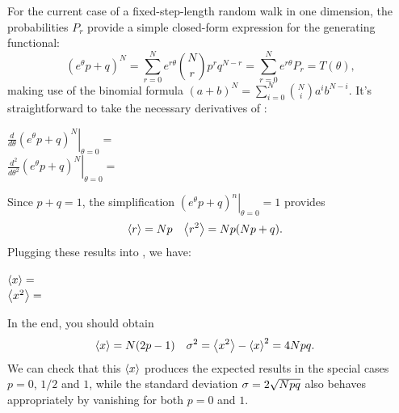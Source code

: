 For the current case of a fixed-step-length random walk in one dimension, the probabilities $P_r$ provide a simple closed-form expression for the generating functional:
\begin{equation}
  \label{eq:gen_func}
  \left(e^{\theta} p + q\right)^N = \sum_{r = 0}^N e^{r \theta} \binom{N}{r} p^r q^{N - r} = \sum_{r = 0}^N e^{r \theta} P_r = T(\theta),
\end{equation}
making use of the binomial formula $\left(a + b\right)^N = \sum_{i = 0}^N \binom{N}{i} a^i b^{N - i}$.
It's straightforward to take the necessary derivatives of :
\begin{mdframed}
  $\displaystyle \left.\frac{d}{d\theta} \left(e^{\theta} p + q\right)^N \right|_{\theta = 0} = $ \\[50 pt]
  $\displaystyle \left.\frac{d^2}{d\theta^2} \left(e^{\theta} p + q\right)^N \right|_{\theta = 0} = $ \\[50 pt]
\end{mdframed}
Since $p + q = 1$, the simplification $\left.\left(e^{\theta} p + q\right)^n \right|_{\theta = 0} = 1$ provides
\begin{align*}
  \left\langle r \right\rangle   & = Np &
  \left\langle r^2 \right\rangle & = Np(Np + q).
\end{align*}
\newpage %
\noindent Plugging these results into , we have:
\begin{mdframed}
  $\left\langle x \right\rangle   = $ \\[50 pt]
  $\left\langle x^2 \right\rangle = $ \\[50 pt]
\end{mdframed}
In the end, you should obtain
\begin{align}
  \label{eq:RWmean}
  \left\langle x \right\rangle & = N(2p - 1) &
  \sigma^2 = \left\langle x^2 \right\rangle - \left\langle x \right\rangle^2 & = 4Npq.
\end{align}
We can check that this $\left\langle x \right\rangle$ produces the expected results in the special cases $p = 0$, $1 / 2$ and $1$, while the standard deviation $\sigma = 2\sqrt{Npq}$ also behaves appropriately by vanishing for both $p = 0$ and $1$.



